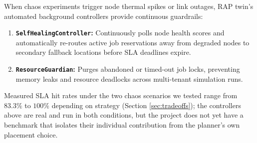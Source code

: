 \documentclass[twoside,twocolumn,10pt]{article}
\begin{document}
When chaos experiments trigger node thermal spikes or link outages, RAP twin's automated background controllers provide continuous guardrails:
\begin{enumerate}
    \item \textbf{\texttt{SelfHealingController}:} Continuously polls node health scores and automatically re-routes active job reservations away from degraded nodes to secondary fallback locations before SLA deadlines expire.
    \item \textbf{\texttt{ResourceGuardian}:} Purges abandoned or timed-out job locks, preventing memory leaks and resource deadlocks across multi-tenant simulation runs.
\end{enumerate}

Measured SLA hit rates under the two chaos scenarios we tested range from $83.3\%$ to $100\%$ depending on strategy (Section \ref{sec:tradeoffs}); the controllers above are real and run in both conditions, but the project does not yet have a benchmark that isolates their individual contribution from the planner's own placement choice.
\end{document}
